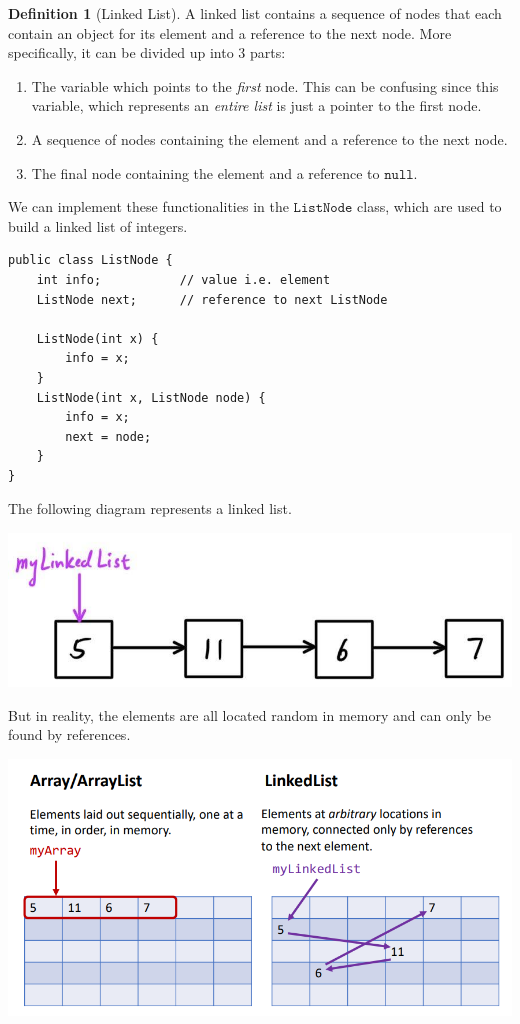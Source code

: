 \documentclass{article}
\theoremstyle{definition}
\theoremstyle{remark}
\theoremstyle{definition}
\newtheorem{definition}{Definition}[section]
\begin{document}
\begin{definition}[Linked List]
A linked list contains a sequence of nodes that each contain an object for its element and a reference to the next node. More specifically, it can be divided up into 3 parts: 
\begin{enumerate}
    \item The variable which points to the \textit{first} node. This can be confusing since this variable, which represents an \textit{entire list} is just a pointer to the first node. 
    \item A sequence of nodes containing the element and a reference to the next node. 
    \item The final node containing the element and a reference to $\texttt{null}$. 
\end{enumerate}
We can implement these functionalities in the $\texttt{ListNode}$ class, which are used to build a linked list of integers. 
\begin{verbatim}
public class ListNode {
    int info;           // value i.e. element 
    ListNode next;      // reference to next ListNode
    
    ListNode(int x) {
        info = x; 
    }
    ListNode(int x, ListNode node) {
        info = x; 
        next = node; 
    }
}
\end{verbatim}
The following diagram represents a linked list. 
\begin{center}
    \includegraphics[scale=0.3]{img/linked_list_diagram.jpg}
\end{center}
But in reality, the elements are all located random in memory and can only be found by references. 
\begin{center}
    \includegraphics[scale=0.3]{img/linked_list_random_memory.png}
\end{center}
\end{definition}
\end{document}
